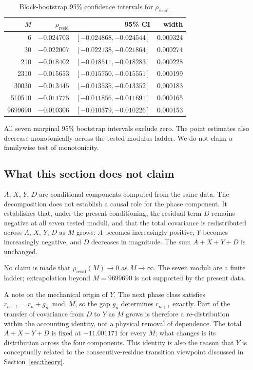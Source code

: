 \begin{table}[ht]
\centering
\caption{Block-bootstrap 95\% confidence intervals for $\rho_{\text{resid}}$.}
\label{tab:bootstrap}
\begin{tabular}{rrrr}
\toprule
$M$ & $\rho_{\text{resid}}$ & 95\% CI & width \\
\midrule
6 & $-0.024703$ & $[-0.024868, -0.024544]$ & 0.000324 \\
30 & $-0.022007$ & $[-0.022138, -0.021864]$ & 0.000274 \\
210 & $-0.018402$ & $[-0.018511, -0.018283]$ & 0.000228 \\
2310 & $-0.015653$ & $[-0.015750, -0.015551]$ & 0.000199 \\
30030 & $-0.013445$ & $[-0.013535, -0.013352]$ & 0.000183 \\
510510 & $-0.011775$ & $[-0.011856, -0.011691]$ & 0.000165 \\
9699690 & $-0.010306$ & $[-0.010379, -0.010226]$ & 0.000153 \\
\bottomrule
\end{tabular}
\end{table}

All seven marginal 95\% bootstrap intervals exclude zero. The point estimates also decrease monotonically across the tested modulus ladder. We do not claim a familywise test of monotonicity.

\subsection{What this section does not claim}

$A$, $X$, $Y$, $D$ are conditional components computed from the same data. The decomposition does not establish a causal role for the phase component. It establishes that, under the present conditioning, the residual term $D$ remains negative at all seven tested moduli, and that the total covariance is redistributed across $A$, $X$, $Y$, $D$ as $M$ grows: $A$ becomes increasingly positive, $Y$ becomes increasingly negative, and $D$ decreases in magnitude. The sum $A+X+Y+D$ is unchanged.

No claim is made that $\rho_{\text{resid}}(M)\to 0$ as $M\to\infty$. The seven moduli are a finite ladder; extrapolation beyond $M=9699690$ is not supported by the present data.

A note on the mechanical origin of $Y$. The next phase class satisfies $r_{n+1} = r_n + g_n \bmod M$, so the gap $g_n$ determines $r_{n+1}$ exactly. Part of the transfer of covariance from $D$ to $Y$ as $M$ grows is therefore a re-distribution within the accounting identity, not a physical removal of dependence. The total $A+X+Y+D$ is fixed at $-11.001171$ for every $M$; what changes is its distribution across the four components. This identity is also the reason that $Y$ is conceptually related to the consecutive-residue transition viewpoint discussed in Section~\ref{sec:theory}.
